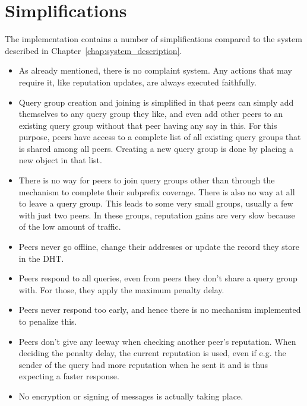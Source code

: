 \section{Simplifications}
The implementation contains a number of simplifications compared to the system
described in Chapter~\ref{chap:system_description}.

\begin{itemize}
\item As already mentioned, there is no complaint system. Any actions that may
require it, like reputation updates, are always executed faithfully.

\item Query group creation and joining is simplified in that peers can simply
add themselves to any query group they like, and even add other peers to an
existing query group without that peer having any say in this. For this purpose,
peers have access to a complete list of all existing query groups that is shared
among all peers. Creating a new query group is done by placing a new object in
that list.

\item There is no way for peers to join query groups other than through the
mechanism to complete their subprefix coverage. There is also no way at all to
leave a query group. This leads to some very small groups, usually a few with
just two peers. In these groups, reputation gains are very slow because of the
low amount of traffic.

\item Peers never go offline, change their addresses or update the record they
store in the DHT.

\item Peers respond to all queries, even from peers they don't share a query
group with. For those, they apply the maximum penalty delay.

\item Peers never respond too early, and hence there is no mechanism implemented
to penalize this.

\item Peers don't give any leeway when checking another peer's reputation. When
deciding the penalty delay, the current reputation is used, even if e.g. the
sender of the query had more reputation when he sent it and is thus expecting a
faster response.

\item No encryption or signing of messages is actually taking place.
\end{itemize}

